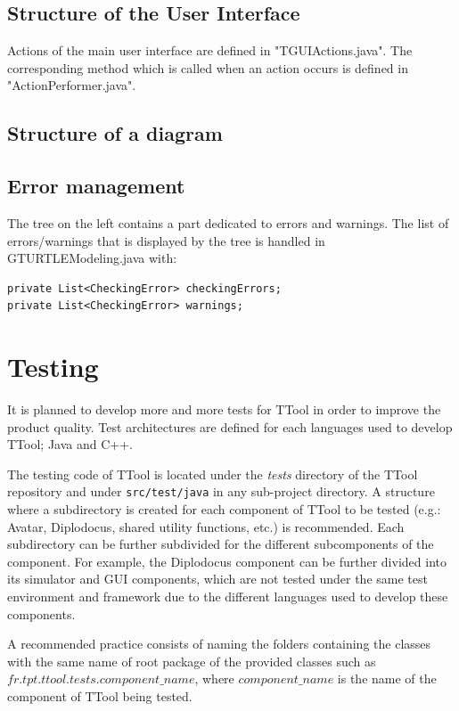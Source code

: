 \documentclass[12pt]{article}
\begin{document}
\subsection{Structure of the User Interface}
Actions of the main user interface are defined in "TGUIActions.java". The corresponding method which is called when an action occurs is defined in "ActionPerformer.java".

\subsection{Structure of a diagram}


\subsection{Error management}
The tree on the left contains a part dedicated to errors and warnings. The list of errors/warnings that is displayed by the tree is handled in GTURTLEModeling.java with:
\begin{lstlisting}
private List<CheckingError> checkingErrors;
private List<CheckingError> warnings;
\end{lstlisting}

\section{Testing}

It is planned to develop more and more tests for TTool in order to improve the
product quality. Test architectures are defined for each languages used to
develop TTool; Java and C++.

The testing code of TTool is located under the \textit{tests} directory of the TTool
repository and under \texttt{src/test/java} in any sub-project directory. A structure where a subdirectory is created for each
component of TTool to be tested (e.g.: Avatar, Diplodocus, shared utility
functions, etc.) is recommended. Each subdirectory can be further subdivided for
the different subcomponents of the component. For example, the Diplodocus component can be
further divided into its simulator and GUI components, which are not tested
under the same test environment and framework due to the different languages
used to develop these components.

A recommended practice consists of naming the folders containing the classes
with the same name of root package of the provided classes such as
$fr.tpt.ttool.tests.component\_name$, where $component\_name$ is the name of the
component of TTool being tested.
\end{document}
